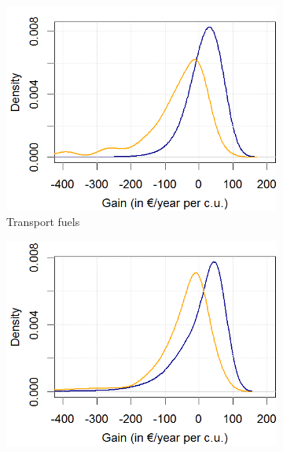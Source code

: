 \documentclass[12pt]{article} %
\begin{document}
\begin{figure}[!htbp]
\hspace{-1.5cm}
\begin{subfigure}{.3\textwidth}
\centering
\includegraphics[width=0.28\paperwidth]{Images/pdf_transport_titled.png}
\caption{Transport fuels}
\end{subfigure}\hfill
\begin{subfigure}{.3\textwidth}
\centering
\includegraphics[width=0.28\paperwidth]{Images/pdf_housing_titled.png}
\end{subfigure}\hfill
\begin{subfigure}{.3\textwidth}
\centering

\end{subfigure}
\end{figure}
\end{document}
